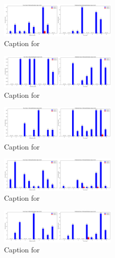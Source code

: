 \documentclass[12pt, a4paper]{article}
\begin{document}
\begin{figure}[ht]
\centering
\includegraphics[width=0.5\textwidth]{combined_class_boundary_pgd/combined_class_9_misclassifications_eps_0.02.png}
\caption{Caption for }
\label{fig:combined_class_9_misclassifications_eps_0.02.png}
\end{figure}

\begin{figure}[ht]
\centering
\includegraphics[width=0.5\textwidth]{combined_class_boundary_pgd/combined_class_0_misclassifications_eps_0.03.png}
\caption{Caption for }
\label{fig:combined_class_0_misclassifications_eps_0.03.png}
\end{figure}

\begin{figure}[ht]
\centering
\includegraphics[width=0.5\textwidth]{combined_class_boundary_pgd/combined_class_1_misclassifications_eps_0.03.png}
\caption{Caption for }
\label{fig:combined_class_1_misclassifications_eps_0.03.png}
\end{figure}

\begin{figure}[ht]
\centering
\includegraphics[width=0.5\textwidth]{combined_class_boundary_pgd/combined_class_2_misclassifications_eps_0.03.png}
\caption{Caption for }
\label{fig:combined_class_2_misclassifications_eps_0.03.png}
\end{figure}

\begin{figure}[ht]
\centering
\includegraphics[width=0.5\textwidth]{combined_class_boundary_pgd/combined_class_3_misclassifications_eps_0.03.png}
\caption{Caption for }
\label{fig:combined_class_3_misclassifications_eps_0.03.png}
\end{figure}
\end{document}
